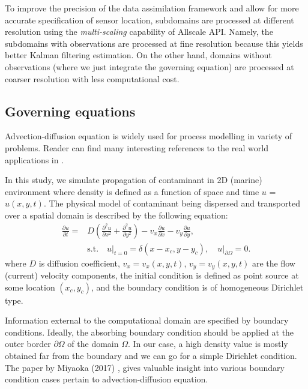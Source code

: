 \documentclass[conference,compsoc]{IEEEtran}
\begin{document}
To improve the precision of the data assimilation framework and allow for more accurate specification of sensor location, subdomains are processed at different resolution using the \textit{multi-scaling} capability of Allscale API. Namely, the subdomains with observations are processed at fine resolution because this yields better Kalman filtering estimation. On the other hand, domains without observations (where we just integrate the governing equation) are processed at coarser resolution with less computational cost. 

\subsection{Governing equations}

Advection-diffusion equation is widely used for process modelling in variety of problems. Reader can find many interesting references to the real world applications in \cite{Miyaoka17}.

In this study, we simulate propagation of contaminant in 2D (marine) environment where density is defined as a function of space and time $u$ = $u(x,y,t)$. The physical model of contaminant being dispersed and transported over a spatial domain is described by the following equation:
\begin{equation}
\begin{aligned}
\frac{\partial u}{\partial t} = &
D \left(\frac{\partial^2 u}{\partial x^2} + \frac{\partial^2 u}{\partial y^2}\right)
- v_x \frac{\partial u}{\partial x}
- v_y \frac{\partial u}{\partial y}, 
\\ 
&
\mbox{s.t.}\,\,\,\,\,\,
u\rvert_{t=0} = \delta(x\!-\!x_c,y\!-\!y_c),
\,\,\,\,\,\,u\rvert_{\partial\Omega}=0.
\end{aligned}
\label{eq:pde}
\end{equation}
where $D$ is diffusion coefficient, $v_x = v_x(x,y,t)$, $v_y = v_y(x,y,t)$ are the flow (current) velocity components, the initial condition is defined as point source at some location $(x_c,y_c)$, and the boundary condition is of homogeneous Dirichlet type.

Information external to the computational domain are specified by boundary conditions. Ideally, the absorbing boundary condition should be applied at the outer border $\partial\Omega$ of the domain $\Omega$. In our case, a high density value is mostly obtained far from the boundary and we can go for a simple Dirichlet condition. The paper by Miyaoka (2017) \cite{Miyaoka17}, gives valuable insight into various boundary condition cases pertain to advection-diffusion equation.
\end{document}
